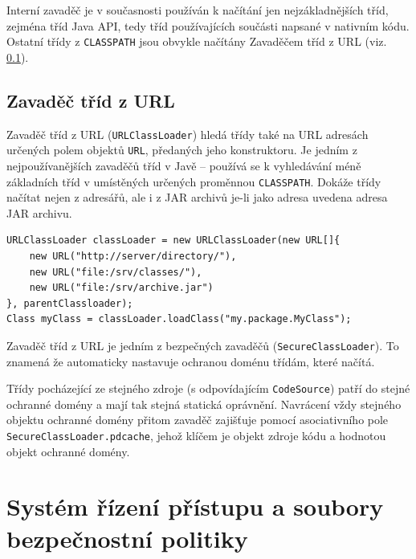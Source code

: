 Interní zavaděč je v současnosti používán k načítání jen nejzákladnějších tříd, zejména tříd Java API, tedy tříd používajících součásti napsané v nativním kódu. Ostatní třídy z {\tt CLASSPATH} jsou obvykle načítány Zavaděčem tříd z URL (viz. \ref{URLClassLoader}).

\subsection{Zavaděč tříd z URL} \label{URLClassLoader}

Zavaděč tříd z URL ({\tt URLClassLoader}) hledá třídy také na URL adresách určených polem objektů {\tt URL}, předaných jeho konstruktoru. Je jedním z nejpoužívanějších zavaděčů tříd v Javě -- používá se k vyhledávání méně základních tříd v umístěných určených proměnnou {\tt CLASSPATH}. Dokáže třídy načítat nejen z adresářů, ale i z JAR archivů je-li jako adresa uvedena adresa JAR archivu. \cite[3.2.5]{oaks}

\begin{lstlisting}[caption=Vytvoření vlastní instance zavaděče tříd z URL, label=urlclassloader]
URLClassLoader classLoader = new URLClassLoader(new URL[]{
    new URL("http://server/directory/"),
    new URL("file:/srv/classes/"),
    new URL("file:/srv/archive.jar")
}, parentClassloader);
Class myClass = classLoader.loadClass("my.package.MyClass");
\end{lstlisting}

Zavaděč tříd z URL je jedním z bezpečných zavaděčů ({\tt SecureClassLoader}). To znamená že automaticky nastavuje ochranou doménu třídám, které načítá.

Třídy pocházející ze stejného zdroje (s odpovídajícím {\tt CodeSource}) patří do stejné ochranné domény a mají tak stejná statická oprávnění. Navrácení vždy stejného objektu ochranné domény přitom zavaděč zajišťuje pomocí asociativního pole {\tt SecureClassLoader.pdcache}, jehož klíčem je objekt zdroje kódu a hodnotou objekt ochranné domény. \cite{sourceSecureClassLoader}

\section{Systém řízení přístupu a soubory bezpečnostní politiky}


